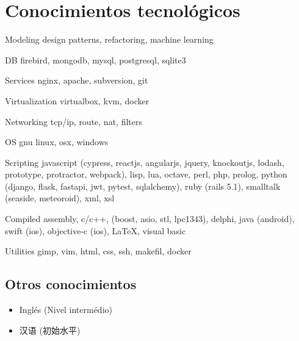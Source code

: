 \documentclass[a4paper]{article}
\begin{document}
\section{Conocimientos tecnol{\'o}gicos}
\begin{CV}
\item[Modeling] design patterns, refactoring, machine learning
\item[DB] firebird, mongodb, mysql, postgresql, sqlite3
\item[Services] nginx, apache, subversion, git
\item[Virtualization] virtualbox, kvm, docker
\item[Networking] tcp/ip, route, nat, filters
\item[OS] gnu linux, osx, windows
\item[Scripting] javascript (cypress, reactjs, angularjs, jquery, knockoutjs, lodash, prototype, protractor, webpack), lisp, lua, octave, perl, php, prolog, python (django, flask, fastapi, jwt, pytest, sqlalchemy), ruby (rails 5.1), smalltalk (seaside, meteoroid), xml, xsl
\item[Compiled] assembly, c/c++, (boost, asio, stl, lpc1343), delphi, java (android), swift (ios), objective-c (ios), \LaTeX, visual basic
\item[Utilities] gimp, vim, html, css, ssh, makefil, docker
\end{CV}

\begin{CJK}{UTF8}{gbsn}
\section{Otros conocimientos}
\begin{itemize}
\item Ingl{\'e}s (Nivel interm{\'e}dio)
\item 汉语 (初始水平)
\end{itemize}
\end{CJK}
\end{document}
